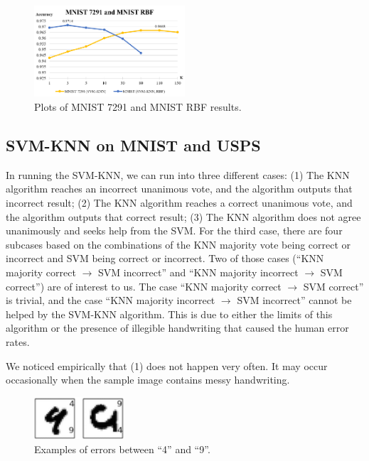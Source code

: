 \documentclass[11pt,letterpaper]{article}
\begin{document}
\begin{figure}[t!]
  \centering
  \includegraphics[keepaspectratio, width=0.5\textwidth]{mnist_rbf_7291.png}
  \caption{Plots of MNIST 7291 and MNIST RBF results.}
\end{figure}

\subsection{SVM-KNN on MNIST and USPS}

In running the SVM-KNN, we can run into three different cases: (1) The KNN algorithm reaches an incorrect unanimous vote, and the algorithm outputs that incorrect result; (2) The KNN algorithm reaches a correct unanimous vote, and the algorithm outputs that correct result; (3) The KNN algorithm does not agree unanimously and seeks help from the SVM. For the third case, there are four subcases based on the combinations of the KNN majority vote being correct or incorrect and SVM being correct or incorrect. Two of those cases (``KNN majority correct $\rightarrow$ SVM incorrect'' and ``KNN majority incorrect $\rightarrow$ SVM correct'') are of interest to us. The case ``KNN majority correct $\rightarrow$ SVM correct'' is trivial, and the case ``KNN majority incorrect $\rightarrow$ SVM incorrect'' cannot be helped by the SVM-KNN algorithm. This is due to either the limits of this algorithm or the presence of illegible handwriting that caused the human error rates.

We noticed empirically that (1) does not happen very often. It may occur occasionally when the sample image contains messy handwriting.

\begin{figure}[t!]
  \centering
  \includegraphics[keepaspectratio, width=0.3\textwidth]{mnist_error.png}
  \caption{Examples of errors between ``4'' and ``9''.}
\end{figure}
\end{document}
